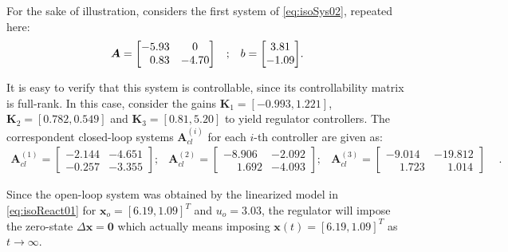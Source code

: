 \documentclass[a4paper,11pt]{book}
\numberwithin{figure}{chapter}
\numberwithin{equation}{chapter}
\numberwithin{table}{chapter}
\theoremstyle{definition}
\newtheorem{example}{Example}[chapter]
\newcounter{boxed-theorem}
\newcounter{boxed-definition}
\newcounter{boxed-example}
\newenvironment{boxed-example}[1]
{\colorlet{shadecolor}{pastelRed!20} \begin{shaded} \begin{example}{#1}}
{\end{example} \end{shaded}}
\begin{document}
\begin{boxed-example}{} \label{ex:regulator01}
	For the sake of illustration, considers the first system of \eqref{eq:isoSys02}, repeated here:
	\begin{equation} \label{eq:isoSys02Rep}
	\begin{matrix}
	    \bm{A} = \begin{bmatrix} 
	        -5.93  &      0 \\
	        \hfill 0.83   &  -4.70 
	    \end{bmatrix} &; & b = \begin{bmatrix} 3.81 \\ -1.09 \end{bmatrix}
	\end{matrix}    
	.\end{equation}
	
	\noindent It is easy to verify that this system is controllable, since its controllability matrix is full-rank. In this case, consider the gains $\bm{K}_1 = [-0.993, 1.221]$, $\bm{K}_2 = [0.782, 0.549]$ and $\bm{K}_3 = [0.81, 5.20]$ to yield regulator controllers. The correspondent closed-loop systems $\bm{A}^{(i)}_{cl}$ for each $i$-th controller are given as:
	\begin{equation}
	\begin{matrix}
		\bm{A}^{(1)}_{cl} = \begin{bmatrix} 
	        -2.144 &  -4.651 \\
		   -0.257 & -3.355
	    \end{bmatrix}; & 
	    \bm{A}^{(2)}_{cl} = \begin{bmatrix} 
	        -8.906 & -2.092 \\
    		\phantom{-}1.692 & -4.093
	    \end{bmatrix}; &
	    \bm{A}^{(3)}_{cl} = \begin{bmatrix} 
	        -9.014 & -19.812 \\
    		\phantom{-}1.723 & \phantom{-}1.014
	    \end{bmatrix} &
	\end{matrix}
	.\end{equation}
	
	\noindent Since the open-loop system was obtained by the linearized model in \eqref{eq:isoReact01} for $\bm{x}_o = [6.19, 1.09]^T$ and $u_o = 3.03$, the regulator will impose the zero-state $\Delta \bm{x} = \bm{0}$ which actually means imposing $\bm{x}(t) = [6.19, 1.09]^T$ as $t \to \infty$. 
\end{boxed-example}
\end{document}
